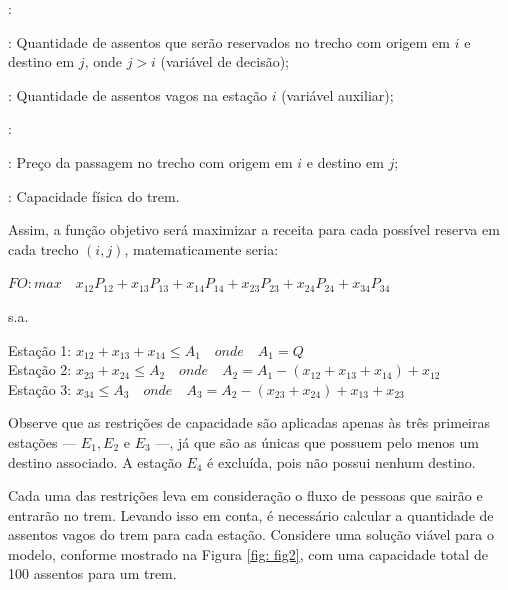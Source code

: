 \begin{description}[style=unboxed, leftmargin=2.5cm, labelindent=1.5cm]
	\setlength{\itemsep}{-2.2em} %
	\setlength{\parskip}{0em} %
	\item[Variáveis]: \\
	\item[$x_{ij}$]: Quantidade de assentos que serão reservados no trecho com origem em $i$ e destino em $j$, onde $j>i$ (variável de decisão); \\
	\item[$A_i$]: Quantidade de assentos vagos na estação $i$ (variável auxiliar); \\
	\item[Parâmetros]: \\
	\item[$P_{ij}$]: Preço da passagem no trecho com origem em $i$ e destino em $j$; \\
	\item[$Q$]: Capacidade física do trem.
\end{description}



Assim, a função objetivo será maximizar a receita para cada possível reserva em cada trecho $(i,j)$, matematicamente seria:

$FO: max \quad x_{12}P_{12} + x_{13}P_{13} + x_{14}P_{14} + x_{23}P_{23} + x_{24}P_{24} + x_{34}P_{34}$

s.a.

Estação 1: $x_{12} + x_{13} + x_{14} \leq A_1 \quad onde \quad A_1 = Q $ \\
\indent Estação 2: $x_{23} + x_{24}  \leq  A_2 \quad onde \quad A_2 = A_1 - (x_{12} + x_{13} + x_{14}) + x_{12} $ \\
\indent Estação 3: $x_{34} \leq A_3 \quad onde \quad A_3 = A_2 - (x_{23} + x_{24}) + x_{13} + x_{23} $

Observe que as restrições de capacidade são aplicadas apenas às três primeiras estações — $E_1, E_2$ e $E_3$ —, já que são as únicas que possuem pelo menos um destino associado. A estação $E_4$ é excluída, pois não possui nenhum destino.

Cada uma das restrições leva em consideração o fluxo de pessoas que sairão e entrarão no trem. Levando isso em conta, é necessário calcular a quantidade de assentos vagos do trem para cada estação. Considere uma solução viável para o modelo, conforme mostrado na Figura \ref{fig: fig2}, com uma capacidade total de 100 assentos para um trem.

